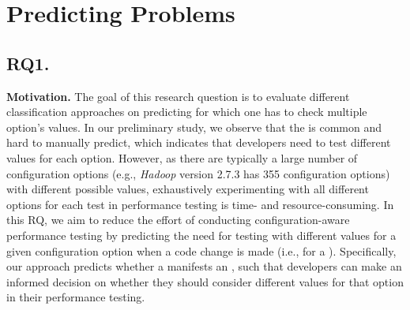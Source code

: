 
\section{Predicting \inconsistent Problems} \label{sec:rq-results}

\subsection*{\textbf{RQ1. \RQII}}
\label{sec:rq2}




\noindent \textbf{Motivation.}
The goal of this research question is to evaluate different classification approaches on predicting for which \instance one has to check multiple option's values. %
In our preliminary study, we observe that the \inconsistent is common and hard to manually predict, %
which indicates that developers need to test different values for each option. However, as there are typically a large number of configuration options (e.g., \emph{Hadoop} version 2.7.3 has 355 configuration options) with different possible values, exhaustively experimenting with all different options for each test in performance testing is time- and resource-consuming. In this RQ, we aim to reduce the effort of conducting configuration-aware performance testing by predicting the need for testing with different values for a given configuration option when a code change is made (i.e., for a \instance). Specifically, our approach predicts whether a \instance manifests an \inconsistent, such that developers can make an informed decision on whether they should consider different values for that option in their performance testing.

